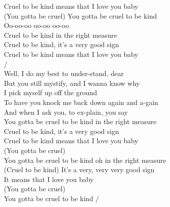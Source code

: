  Cruel to be  kind  means that I  love you  baby\\
(You  gotta be cruel) You  gotta be cruel to be  kind\\
 Oo-oo-oo  oo-oo  oo-oo\\
 Cruel to be  kind  in the right  measure\\
 Cruel to be  kind, it's a  very good  sign\\
 Cruel to be  kind  means that I  love you  baby\\
/\\
Well, I  do my best to under-stand, dear\\
But you  still mystify, and  I wanna know why\\
 I pick myself up  off the ground\\
To have you  knock me  back down  again and a-gain\\
And when I  ask you, to ex-plain, you  say\\
You gotta be  cruel to be  kind  in the right  measure\\
 Cruel to be  kind, it's a  very good  sign\\
 Cruel to be  kind  means that I  love you  baby\\
(You  gotta be cruel)\\
You  gotta be cruel to be  kind  oh  in the right  measure\\
 (Cruel to be  kind) It's a  very, very  very good  sign\\
 It  means that I  love you  baby\\
(You  gotta be cruel)\\
You  gotta be cruel to be  kind /
